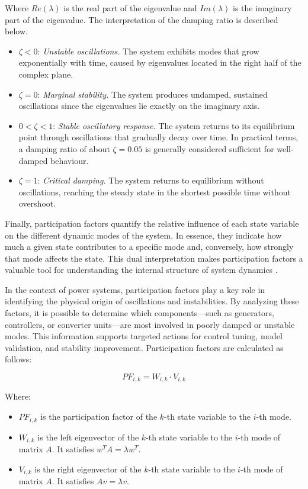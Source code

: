 Where $Re(\lambda)$ is the real part of the eigenvalue and $Im(\lambda)$ is the imaginary part of the eigenvalue. The interpretation of the damping ratio is described below.

\begin{itemize}
  \item $\zeta < 0$: \textit{Unstable oscillations.} The system exhibits modes that grow exponentially with time, caused by eigenvalues located in the right half of the complex plane.
  \item $\zeta = 0$: \textit{Marginal stability.} The system produces undamped, sustained oscillations since the eigenvalues lie exactly on the imaginary axis.
  \item $0 < \zeta < 1$: \textit{Stable oscillatory response.} The system returns to its equilibrium point through oscillations that gradually decay over time. In practical terms, a damping ratio of about $\zeta = 0.05$ is generally considered sufficient for well-damped behaviour.
  \item $\zeta = 1$: \textit{Critical damping.} The system returns to equilibrium without oscillations, reaching the steady state in the shortest possible time without overshoot.
\end{itemize}

Finally, participation factors quantify the relative influence of each state variable on the different dynamic modes of the system. In essence,
they indicate how much a given state contributes to a specific mode and, conversely, how strongly that mode affects the state.
This dual interpretation makes participation factors a valuable tool for understanding the internal structure of system dynamics \cite{KonovaPF}.

In the context of power systems, participation factors play a key role in identifying the physical origin of oscillations and instabilities.
By analyzing these factors, it is possible to determine which components—such as generators, controllers, or converter units—are most involved in poorly damped or unstable modes.
This information supports targeted actions for control tuning, model validation, and stability improvement. Participation factors are calculated as follows:

\begin{equation}
PF_{i,k} = W_{i,k} \cdot V_{i,k}
\end{equation}

Where:
\begin{itemize}
  \item $PF_{i,k}$ is the participation factor of the $k$-th state variable to the $i$-th mode.
  \item $W_{i,k}$ is the left eigenvector of the $k$-th state variable to the $i$-th mode of matrix $A$. It satisfies $w^T A = \lambda w^T$.
  \item $V_{i,k}$ is the right eigenvector of the $k$-th state variable to the $i$-th mode of matrix $A$. It satisfies $A v= \lambda v$.
\end{itemize}

